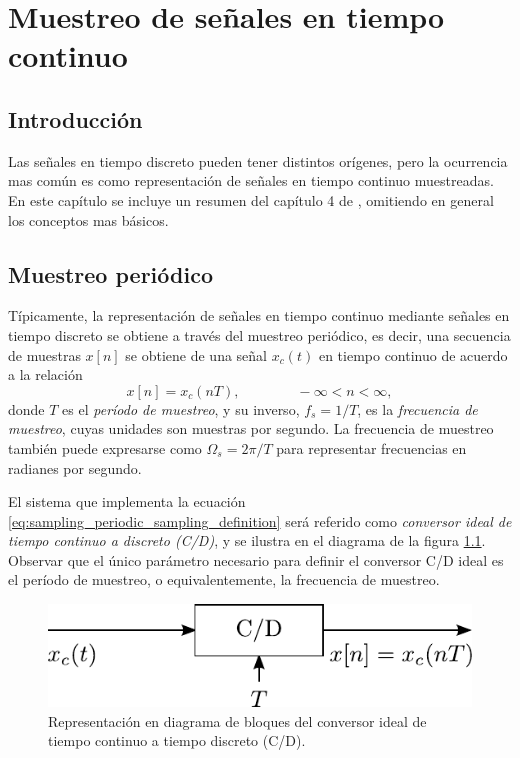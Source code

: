 \documentclass[a4paper]{report}
\begin{document}
\chapter{Muestreo de señales en tiempo continuo}

\section{Introducción}

Las señales en tiempo discreto pueden tener distintos orígenes, pero la ocurrencia mas común es como representación de señales en tiempo continuo muestreadas. En este capítulo se incluye un resumen del capítulo 4 de \cite{oppenheim2009discrete}, omitiendo en general los conceptos mas básicos.

\section{Muestreo periódico}

Típicamente, la representación de señales en tiempo continuo mediante señales en tiempo discreto se obtiene a través del muestreo periódico, es decir, una secuencia de muestras \(x[n]\) se obtiene de una señal \(x_c(t)\) en tiempo continuo de acuerdo a la relación
\begin{equation}\label{eq:sampling_periodic_sampling_definition}
 x[n]=x_c(nT),
 \qquad\qquad 
 -\infty<n<\infty, 
\end{equation}
donde \(T\) es el \emph{período de muestreo}, y su inverso, \(f_s=1/T\), es la \emph{frecuencia de muestreo}, cuyas unidades son muestras por segundo. La frecuencia de muestreo también puede expresarse como \(\Omega_s=2\pi/T\) para representar frecuencias en radianes por segundo.

El sistema que implementa la ecuación \ref{eq:sampling_periodic_sampling_definition} será referido como \emph{conversor ideal de tiempo continuo a discreto (C/D)}, y se ilustra en el diagrama de la figura \ref{fig:sampling_continous_discrete_converter}. Observar que el único parámetro necesario para definir el conversor C/D ideal es el período de muestreo, o equivalentemente, la frecuencia de muestreo. 
\begin{figure}[!htb]
  \begin{minipage}[c]{0.39\textwidth}
    \includegraphics[width=\textwidth]{figuras/sampling_continous_discrete_converter.pdf}
  \end{minipage}\hfill
  \begin{minipage}[c]{0.51\textwidth}
    \caption{
     Representación en diagrama de bloques del conversor ideal de tiempo continuo a tiempo discreto (C/D).
    }\label{fig:sampling_continous_discrete_converter}
  \end{minipage}
\end{figure}
\end{document}
